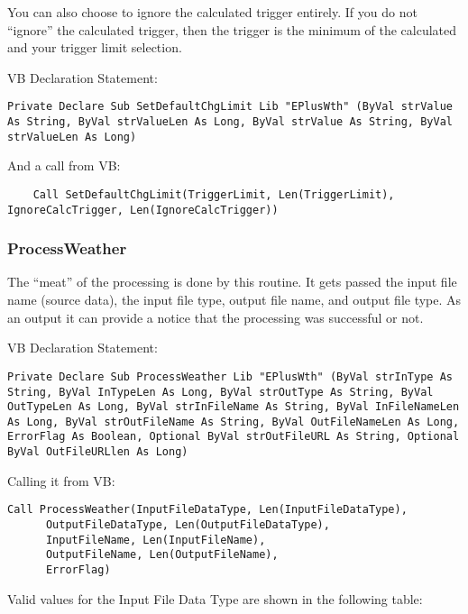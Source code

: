 You can also choose to ignore the calculated trigger entirely. If you do not ``ignore'' the calculated trigger, then the trigger is the minimum of the calculated and your trigger limit selection.

VB Declaration Statement:

\begin{lstlisting}
Private Declare Sub SetDefaultChgLimit Lib "EPlusWth" (ByVal strValue As String, ByVal strValueLen As Long, ByVal strValue As String, ByVal strValueLen As Long)
\end{lstlisting}

And a call from VB:

\begin{lstlisting}
    Call SetDefaultChgLimit(TriggerLimit, Len(TriggerLimit), IgnoreCalcTrigger, Len(IgnoreCalcTrigger))
\end{lstlisting}

\subsubsection{ProcessWeather}\label{processweather}

The ``meat'' of the processing is done by this routine. It gets passed the input file name (source data), the input file type, output file name, and output file type. As an output it can provide a notice that the processing was successful or not.

VB Declaration Statement:

\begin{lstlisting}
Private Declare Sub ProcessWeather Lib "EPlusWth" (ByVal strInType As String, ByVal InTypeLen As Long, ByVal strOutType As String, ByVal OutTypeLen As Long, ByVal strInFileName As String, ByVal InFileNameLen As Long, ByVal strOutFileName As String, ByVal OutFileNameLen As Long, ErrorFlag As Boolean, Optional ByVal strOutFileURL As String, Optional ByVal OutFileURLlen As Long)
\end{lstlisting}

Calling it from VB:

\begin{lstlisting}
Call ProcessWeather(InputFileDataType, Len(InputFileDataType),
      OutputFileDataType, Len(OutputFileDataType),
      InputFileName, Len(InputFileName),
      OutputFileName, Len(OutputFileName),
      ErrorFlag)
\end{lstlisting}

Valid values for the Input File Data Type are shown in the following table:


